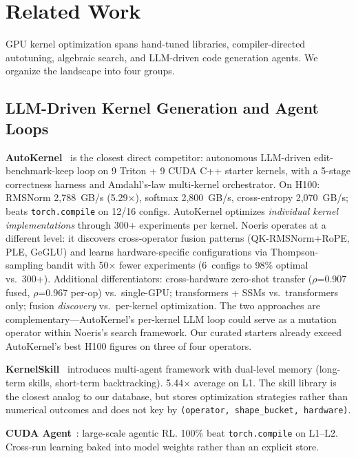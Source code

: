 \documentclass[11pt]{article}
\begin{document}
\section{Related Work}
\label{sec:related}

GPU kernel optimization spans hand-tuned libraries, compiler-directed
autotuning, algebraic search, and LLM-driven code generation agents. We organize
the landscape into four groups.

\subsection{LLM-Driven Kernel Generation and Agent Loops}
\label{sec:rw-llm}

\textbf{AutoKernel}~\citep{autokernel} is the closest direct competitor:
autonomous LLM-driven edit-benchmark-keep loop on 9 Triton + 9 CUDA C++ starter
kernels, with a 5-stage correctness harness and Amdahl's-law multi-kernel
orchestrator. On H100: RMSNorm 2,788~GB/s (5.29$\times$), softmax 2,800~GB/s,
cross-entropy 2,070~GB/s; beats \texttt{torch.compile} on 12/16 configs.
AutoKernel optimizes \emph{individual kernel implementations} through 300+
experiments per kernel. Noeris operates at a different level: it discovers
cross-operator fusion patterns (QK-RMSNorm+RoPE, PLE, GeGLU) and learns
hardware-specific configurations via Thompson-sampling bandit with 50$\times$
fewer experiments (6~configs to 98\% optimal vs.\ 300+). Additional
differentiators: cross-hardware zero-shot transfer ($\rho$=0.907 fused,
$\rho$=0.967 per-op) vs.\ single-GPU; transformers + SSMs vs.\ transformers
only; fusion \emph{discovery} vs.\ per-kernel optimization. The two approaches
are complementary---AutoKernel's per-kernel LLM loop could serve as a mutation
operator within Noeris's search framework. Our curated starters already exceed
AutoKernel's best H100 figures on three of four operators.

\textbf{KernelSkill}~\citep{kernelskill} introduces multi-agent framework with
dual-level memory (long-term skills, short-term backtracking). 5.44$\times$
average on L1. The skill library is the closest analog to our database, but
stores optimization strategies rather than numerical outcomes and does not key by
\texttt{(operator, shape\_bucket, hardware)}.

\textbf{CUDA Agent}~\citep{cudaagent}: large-scale agentic RL. 100\% beat
\texttt{torch.compile} on L1--L2. Cross-run learning baked into model weights
rather than an explicit store.
\end{document}
